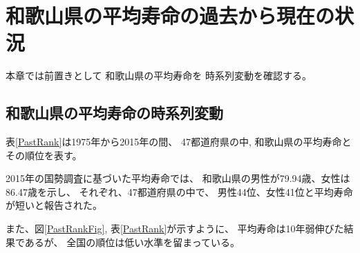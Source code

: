 
%



%
%
%







%
%
%
%
%
%
%




\chapter{和歌山県の平均寿命の過去から現在の状況}


本章では前置きとして
和歌山県の平均寿命を
時系列変動を確認する。



\section{和歌山県の平均寿命の時系列変動}

表\ref{PastRank}は1975年から2015年の間、
47都道府県の中, 和歌山県の平均寿命とその順位を表す。

2015年の国勢調査に基づいた平均寿命では、
和歌山県の男性が79.94歳、女性は86.47歳を示し、
それぞれ、47都道府県の中で、
男性44位、女性41位と平均寿命が短いと報告された。


また、図\ref{PastRankFig}, 表\ref{PastRank}が示すように、
平均寿命は10年弱伸びた結果であるが、
全国の順位は低い水準を留まっている。

